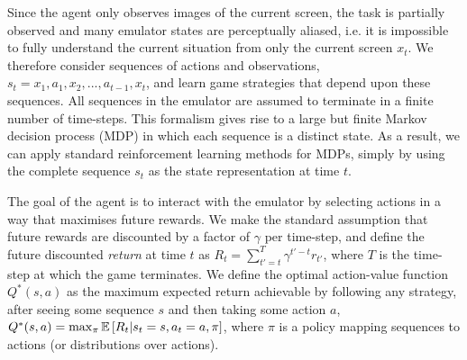 \documentclass{article} %
\begin{document}
Since the agent only observes images of the current screen, the task is partially observed and many emulator states are perceptually aliased, i.e. it is impossible to fully understand the current situation from only the current screen $x_t$. We therefore consider sequences of actions and observations, $s_t = {x_1, a_1, x_2, ..., a_{t-1}, x_t}$, and learn game strategies that depend upon these sequences. All sequences in the emulator are assumed to terminate in a finite number of time-steps. This formalism gives rise to a large but finite Markov decision process (MDP) in which each sequence is a distinct state. As a result, we can apply standard reinforcement learning methods for MDPs, simply by using the complete sequence $s_t$ as the state representation at time $t$.

The goal of the agent is to interact with the emulator by selecting actions in a way that maximises future rewards. We make the standard assumption that future rewards are discounted by a factor of $\gamma$ per time-step, and define the future discounted \emph{return} at time $t$ as $R_t = \sum_{t'=t}^{T} \gamma^{t'-t} r_{t'}$, where $T$
is the time-step at which the game terminates. We define the optimal action-value function $Q^*(s,a)$ as the maximum expected return achievable by following any strategy, after seeing some sequence $s$ and then taking some action $a$, $Q^*(s,a) = \max_{\pi} \mathbb{E} \left[  R_t | s_t=s, a_t=a, \pi  \right]$, where $\pi$ is a policy mapping sequences to actions (or distributions over actions).
\end{document}
